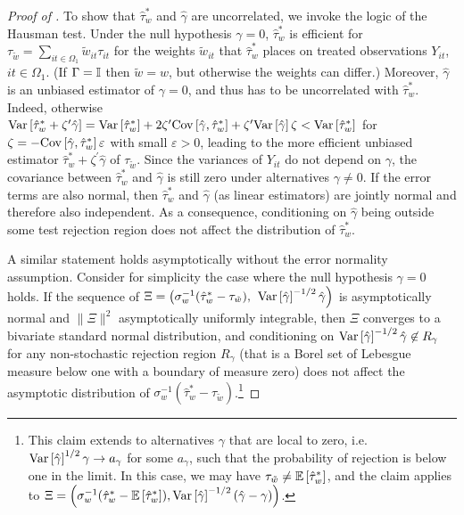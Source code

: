 \documentclass[english,11pt]{article}
\theoremstyle{plain}
\theoremstyle{plain}
\theoremstyle{plain}
\theoremstyle{plain}
\let\ref\Cref
\begin{document}
\begin{proof}[Proof of \ref{prop:pretesting}]
To show that $\hat{\tau}_{w}^{*}$ and $\hat{\gamma}$ are uncorrelated,
we invoke the logic of the Hausman test. Under the null hypothesis
$\gamma=0$, $\hat{\tau}_{w}^{*}$ is efficient for $\tau_{\tilde{w}}=\sum_{it\in\Omega_{1}}\tilde{w}_{it}\tau_{it}$
for the weights $\tilde{w}_{it}$ that $\hat{\tau}_{w}^{*}$ places
on treated observations $Y_{it}$, $it\in\Omega_{1}$. (If $\Gamma=\mathbb{I}$
then $\tilde{w}=w$, but otherwise the weights can differ.) Moreover,
$\hat{\gamma}$ is an unbiased estimator of $\gamma=0$, and thus
has to be uncorrelated with $\hat{\tau}_{w}^{\ast}$. Indeed, otherwise
$\mathrm{Var}\left[\hat{\tau}_{w}^{\ast}+\zeta^{\prime}\hat{\gamma}\right]=\mathrm{Var}\left[\hat{\tau}_{w}^{\ast}\right]+2\zeta'\mathrm{Cov}\left[\hat{\gamma},\hat{\tau}_{w}^{\ast}\right]+\zeta'\mathrm{Var}\left[\hat{\gamma}\right]\zeta<\mathrm{Var}\left[\hat{\tau}_{w}^{\ast}\right]$
for $\zeta=-\mathrm{Cov}\left[\hat{\gamma},\hat{\tau}_{w}^{\ast}\right]\varepsilon$
with small $\varepsilon>0$, leading to the more efficient unbiased
estimator $\hat{\tau}_{w}^{\ast}+\zeta^{\prime}\hat{\gamma}$ of $\tau_{\tilde{w}}$.
Since the variances of $Y_{it}$ do not depend on $\gamma$, the covariance
between $\hat{\tau}_{w}^{*}$ and $\hat{\gamma}$ is still zero under
alternatives $\gamma\neq0$. If the error terms are also normal, then
$\hat{\tau}_{w}^{*}$ and $\hat{\gamma}$ (as linear estimators) are
jointly normal and therefore also independent. As a consequence, conditioning
on $\hat{\gamma}$ being outside some test rejection region does not
affect the distribution of $\hat{\tau}_{w}^{*}$.

A similar statement holds asymptotically without the error normality
assumption. Consider for simplicity the case where the null hypothesis
$\gamma=0$ holds. If the sequence of $\Xi=\left(\sigma_{w}^{-1}(\hat{\tau}_{w}^{*}-\tau_{\tilde{w}}),\right.\allowbreak\left.\mathrm{Var}\left[\hat{\gamma}\right]^{-1/2}\hat{\gamma}\right)$
is asymptotically normal and $\|\Xi\|^{2}$ asymptotically uniformly
integrable, then $\Xi$ converges to a bivariate standard normal distribution,
and conditioning on $\mathrm{Var}\left[\hat{\gamma}\right]^{-1/2}\hat{\gamma}\not\in R_{\gamma}$
for any non-stochastic rejection region $R_{\gamma}$ (that is a Borel
set of Lebesgue measure below one with a boundary of measure zero)
does not affect the asymptotic distribution of $\sigma_{w}^{-1}(\hat{\tau}_{w}^{*}-\tau_{\tilde{w}})$.\footnote{This claim extends to alternatives $\gamma$ that are local to zero,
i.e. $\mathrm{Var}\left[\hat{\gamma}\right]^{1/2}\gamma\rightarrow a_{\gamma}$ for some
$a_{\gamma}$, such that the probability of rejection is below one
in the limit. In this case, we may have $\tau_{\tilde{w}}\neq\mathbb{E}\left[\hat{\tau}_{w}^{*}\right]$,
and the claim applies to $\Xi=\left(\sigma_{w}^{-1}(\hat{\tau}_{w}^{*}-\mathbb{E}\left[\hat{\tau}_{w}^{*}\right]),\mathrm{Var}\left[\hat{\gamma}\right]^{-1/2}(\hat{\gamma}-\gamma)\right)$.}


\end{proof}
\end{document}
